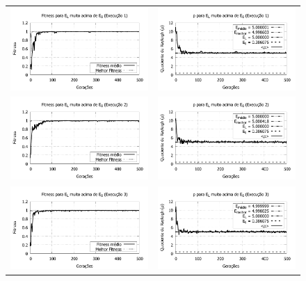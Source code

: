 \begin{figure}[p]
	\centering
  \begin{tabular}{@{}cc@{}}
   			
		\includegraphics[width=.40\textwidth]{figs/resultados/variandoEL/T3E1_fitness.pdf} &
    \includegraphics[width=.40\textwidth]{figs/resultados/variandoEL/T3E1_rho.pdf}   \\

		\includegraphics[width=.40\textwidth]{figs/resultados/variandoEL/T3E2_fitness.pdf} &
    \includegraphics[width=.40\textwidth]{figs/resultados/variandoEL/T3E2_rho.pdf}   \\
		
		\includegraphics[width=.40\textwidth]{figs/resultados/variandoEL/T3E3_fitness.pdf} &
    \includegraphics[width=.40\textwidth]{figs/resultados/variandoEL/T3E3_rho.pdf}   \\
		

\end{tabular}
\end{figure}

